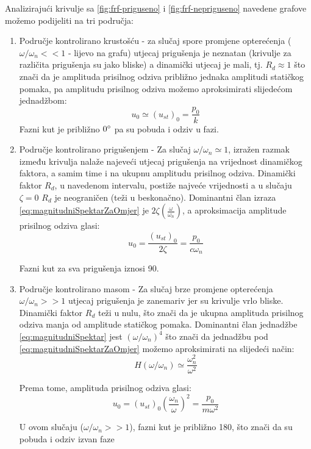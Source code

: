 Analizirajući krivulje sa \eqref{fig:frf-priguseno} i \eqref{fig:frf-nepriguseno} 
navedene grafove možemo podijeliti na tri područja:
\begin{enumerate}
    \item Područje kontrolirano krustošću - za slučaj spore promjene opterećenja
        ($\omega/\omega_n<<1$ - lijevo na grafu) utjecaj prigušenja je neznatan
        (krivulje za različita prigušenja su jako bliske) a dinamički utjecaj je mali, 
        tj. $R_d \approx 1$ što znači da je amplituda prisilnog odziva približno jednaka
        amplitudi statičkog pomaka, pa amplitudu prisilnog odziva možemo
        aproksimirati slijedećom jednadžbom:
        \begin{equation}\label{eq:frf_prvi_sektor}
            u_0\simeq(u_{st})_0=\frac{p_0}{k}
        \end{equation}
        Fazni kut je približno $0\degree$ pa su pobuda i odziv u fazi.

    \item Područje kontrolirano prigušenjem - Za slučaj $\omega/\omega_n\simeq 1$,
        izražen razmak između krivulja nalaže najeveći utjecaj prigušenja na
        vrijednost dinamičkog faktora, a samim time i na ukupnu amplitudu prisilnog
        odziva. Dinamički faktor $R_d$, u navedenom intervalu, postiže najveće
        vrijednosti a u slučaju $\zeta=0$ $R_d$ je neograničen (teži u beskonačno). 
        Dominantni član izraza \eqref{eq:magnitudniSpektarZaOmjer} je
        $2\zeta(\frac{\omega}{\omega_n})$, a aproksimacija amplitude prisilnog
        odziva glasi: 
        \begin{equation}\label{eq:frf_rezonanca}
            u_0=\frac{(u_{st})_0}{2\zeta}=\frac{p_0}{c\omega_n}
        \end{equation}

        Fazni kut za sva prigušenja iznosi 90\degree. 

    \item Područje kontrolirano masom - Za slučaj brze promjene opterećenja
        $\omega/\omega_n>>1$ utjecaj prigušenja je zanemariv jer su krivulje vrlo
        bliske. Dinamički faktor $R_d$ teži u nulu, što znači da je ukupna amplituda
        prisilnog odziva manja od amplitude statičkog pomaka. Dominantni član jednadžbe 
        \eqref{eq:magnitudniSpektar} jest $(\omega/\omega_n)^4$ što znači
        da jednadžbu pod \eqref{eq:magnitudniSpektarZaOmjer} možemo aproksimirati na 
        slijedeći način:
        \[
            H(\omega/\omega_n)\simeq \frac{\omega_n^2}{\omega^2}
        \]

        Prema tome, amplituda prisilnog odziva glasi:
        \begin{equation}\label{eq:frf_treci_sektor}
            u_0=(u_{st})_0\left(\frac{\omega_n}{\omega}\right)^2=\frac{p_0}{m\omega^2}
        \end{equation}
        
        U ovom slučaju ($\omega/\omega_n >> 1$), fazni kut je približno 180\degree,
        što znači da su pobuda i odziv izvan faze
\end{enumerate}



